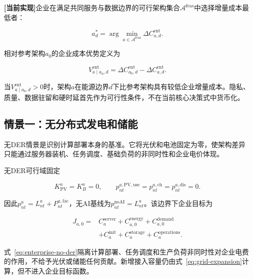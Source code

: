 \documentclass[preprint]{elsarticle}
\newcommand{\implemented}{\textcolor{green!40!black}{\textbf{[当前实现]}}}
\newcommand{\Aset}{\mathcal A}
\begin{document}
\implemented 企业在满足共同服务与数据边界的可行架构集合$\Aset^{\mathrm{feas}}$中选择增量成本最低者：

\begin{equation}
 a_d^{*}=\arg\min_{a\in\Aset^{\mathrm{feas}}}
 \Delta C^{\mathrm{ent}}_{a,d}.
 \label{eq:enterprise-choice}
\end{equation}

相对参考架构$a_0$的企业成本优势定义为

\begin{equation}
 V^{\mathrm{ent}}_{a\mid a_0,d}
 =\Delta C^{\mathrm{ent}}_{a_0,d}
 -\Delta C^{\mathrm{ent}}_{a,d}.
 \label{eq:enterprise-value}
\end{equation}

当$V^{\mathrm{ent}}_{a\mid a_0,d}>0$时，架构$a$在能源边界$d$下比参考架构具有较低企业增量成本。隐私、质量、数据驻留和硬时延首先作为可行性条件，不在当前核心决策式中货币化。

\subsection{情景一：无分布式发电和储能}

无DER情景是识别计算部署本身的基准。它将光伏和电池固定为零，使架构差异只能通过服务器装机、任务调度、基础负荷的非同时性和企业电价体现。

无DER可行域固定

\begin{equation}
 K^{a}_{\mathrm{PV}}=K^a_B=0,\qquad
 p^{a,\mathrm{PV,use}}_{nt}=p^{a,\mathrm{ch}}_{nt}
 =p^{a,\mathrm{dis}}_{nt}=0.
 \label{eq:no-der-domain}
\end{equation}

因此$p^a_{nt}=L^a_{nt}+P^{a,\mathrm{fac}}_{nt}$，无AI基线为$p^{\mathrm{noAI}}_{nt}=L^a_{nt}$。该边界下企业目标为

\begin{equation}
\begin{aligned}
 J_{a,0}={}&C_a^{\mathrm{server}}
 +C_{a,0}^{\mathrm{energy}}+C_{a,0}^{\mathrm{demand}}\\
 &+C_a^{\mathrm{init}}+C_a^{\mathrm{storage}}
 +C_a^{\mathrm{operations}}.
\end{aligned}
 \label{eq:enterprise-no-der}
\end{equation}

式~\eqref{eq:enterprise-no-der}隔离计算部署、任务调度和生产负荷非同时性对企业电费的作用，不给予光伏或储能任何贡献。新增接入容量仍由式~\eqref{eq:grid-expansion}计算，但不进入企业目标函数。
\end{document}
